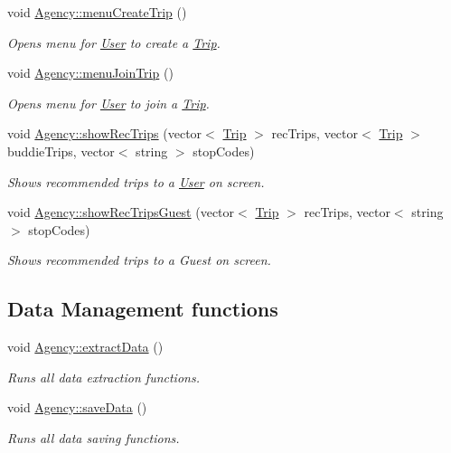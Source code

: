 \begin{DoxyCompactItemize}
\mbox{\label{group___agency_ga07c72d02ed02eac58a0624feb7fccea8}} 
void \hyperlink{group___agency_ga07c72d02ed02eac58a0624feb7fccea8}{Agency\+::menu\+Create\+Trip} ()
\begin{DoxyCompactList}\small\item\em Opens menu for \hyperlink{class_user}{User} to create a \hyperlink{class_trip}{Trip}. \end{DoxyCompactList}\item 
\mbox{\label{group___agency_gab83663afe4fceea7def561cbf3a85c84}} 
void \hyperlink{group___agency_gab83663afe4fceea7def561cbf3a85c84}{Agency\+::menu\+Join\+Trip} ()
\begin{DoxyCompactList}\small\item\em Opens menu for \hyperlink{class_user}{User} to join a \hyperlink{class_trip}{Trip}. \end{DoxyCompactList}\item 
void \hyperlink{group___agency_gabc352c6cad4e22817e2a52a0e756e295}{Agency\+::show\+Rec\+Trips} (vector$<$ \hyperlink{class_trip}{Trip} $>$ rec\+Trips, vector$<$ \hyperlink{class_trip}{Trip} $>$ buddie\+Trips, vector$<$ string $>$ stop\+Codes)
\begin{DoxyCompactList}\small\item\em Shows recommended trips to a \hyperlink{class_user}{User} on screen. \end{DoxyCompactList}\item 
void \hyperlink{group___agency_ga7cde2e6cef7a7e4dbcb84af39a8caa34}{Agency\+::show\+Rec\+Trips\+Guest} (vector$<$ \hyperlink{class_trip}{Trip} $>$ rec\+Trips, vector$<$ string $>$ stop\+Codes)
\begin{DoxyCompactList}\small\item\em Shows recommended trips to a Guest on screen. \end{DoxyCompactList}\end{DoxyCompactItemize}
\subsection*{Data Management functions}
\begin{DoxyCompactItemize}
\item 
void \hyperlink{group___agency_ga20bc20b90914b5e446b683dcd7f6d0ef}{Agency\+::extract\+Data} ()
\begin{DoxyCompactList}\small\item\em Runs all data extraction functions. \end{DoxyCompactList}\item 
\mbox{\label{group___agency_ga67c29f4711b1596630ae970e6a9027ac}} 
void \hyperlink{group___agency_ga67c29f4711b1596630ae970e6a9027ac}{Agency\+::save\+Data} ()
\begin{DoxyCompactList}\small\item\em Runs all data saving functions. \end{DoxyCompactList}\end{DoxyCompactItemize}
